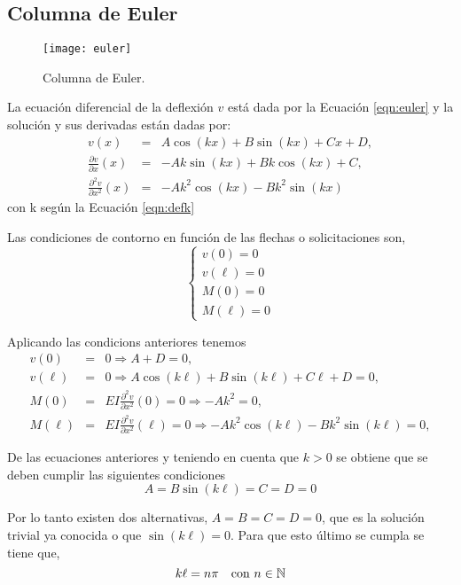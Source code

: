 \subsection{Columna de Euler}


\begin{figure}[htb]
	\centering
	\texttt{[image: euler]}
	\caption{Columna de Euler.}
	\label{fig:euler}
\end{figure}

La ecuación diferencial de la deflexión $v$ está dada por la Ecuación \eqref{eqn:euler} y la solución y sus derivadas están dadas por:
\begin{eqnarray}
v(x) &=& A \cos(k x ) + B \sin(kx) + C x + D, \\
\frac{\partial   v}{\partial x  } (x) &=& -A k \sin(k x ) + B k \cos(kx) + C , \\
\frac{\partial^2 v}{\partial x^2} (x) &=& - A k^2 \cos(k x ) - B k^2 \sin(kx)
\end{eqnarray}
con k según la Ecuación \eqref{eqn:defk}

Las condiciones de contorno en función de las flechas o solicitaciones son,
\begin{equation}
\left\{
\begin{array}{l}
v(0)=0 \\[.5em]
\displaystyle v(\ell)=0\\[1em]
M(0)=0\\[.5em]
M(\ell)=0
\end{array}
\right.
\end{equation}

Aplicando las condicions anteriores tenemos
\begin{eqnarray}
v(0) &=& 0 \Rightarrow A + D = 0, \\
v(\ell) &=& 0 \Rightarrow A \cos(k \ell) + B \sin(k \ell) + C \ell + D = 0, \\
M(0) &=& EI \frac {\partial^2 v}{\partial x^2} (0) = 0 \Rightarrow -Ak^2 = 0,  \\
M(\ell) &=& EI \frac{\partial^2 v}{\partial x^2} (\ell) = 0  \Rightarrow -Ak^2\cos(k \ell) -  B k^2 \sin(k\ell) = 0,
\end{eqnarray}

De las ecuaciones anteriores y teniendo en cuenta que $k>0$ se obtiene que se deben cumplir las siguientes condiciones
\begin{equation}
A = B\sin(k\ell) = C = D = 0
\end{equation}

Por lo tanto existen dos alternativas, $A = B = C = D = 0$, que es la solución trivial ya conocida o que $\sin(k\ell) = 0$.
Para que esto último se cumpla se tiene que,
\begin{equation}
k \ell = n \pi  \quad \text{con} \,\, n\in {\mathbb N}
\end{equation}

